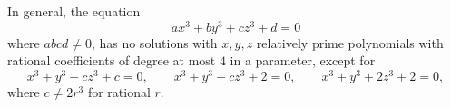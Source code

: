 \begin{proposition}
    In general, the equation
\[
    ax^3+by^3+cz^3+d=0
\]
    where $abcd\ne0$, has no solutions with $x,y,z$ relatively prime polynomials with rational coefficients of degree at most $4$ in a parameter, except for
\[
    x^3+y^3+cz^3+c=0,\qquad x^3+y^3+cz^3+2=0,\qquad x^3+y^3+2z^3+2=0,
\]
    where $c\ne2r^3$ for rational $r$.
\end{proposition}
